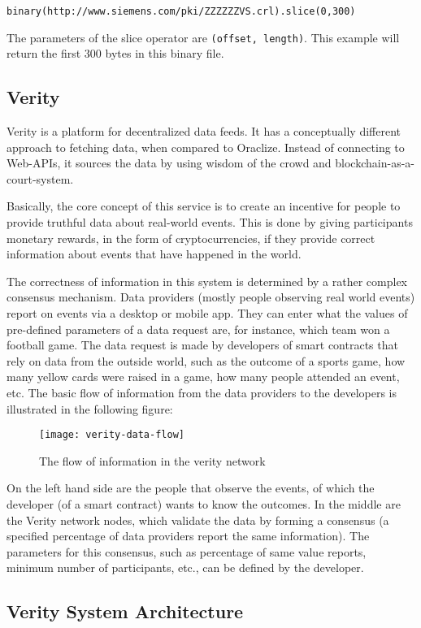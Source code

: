 \texttt{binary(http://www.siemens.com/pki/ZZZZZZVS.crl).slice(0,300)}

The parameters of the slice operator are \texttt{(offset, length)}. This example will return the first 300 bytes in this binary file.
\subsection{Verity}
Verity is a platform for decentralized data feeds. It has a conceptually different approach to fetching data, when compared to Oraclize. Instead of connecting to Web-APIs, it sources the data by using wisdom of the crowd and blockchain-as-a-court-system\cite{veritywhitepaper}.

Basically, the core concept of this service is to create an incentive for people to provide truthful data about real-world events. This is done by giving participants monetary rewards, in the form of cryptocurrencies, if they provide correct information about events that have happened in the world.

The correctness of information in this system is determined by a rather complex consensus mechanism. Data providers (mostly people observing real world events) report on events via a desktop or mobile app. They can enter what the values of pre-defined parameters of a data request are, for instance, which team won a football game. The data request is made by developers of smart contracts that rely on data from the outside world, such as the outcome of a sports game, how many yellow cards were raised in a game, how many people attended an event, etc. The basic flow of information from the data providers to the developers is illustrated in the following figure:
\begin{figure}[H]
\centering
\texttt{[image: verity-data-flow]}
\caption{The flow of information in the verity network\cite{veritywhitepaper}}
\end{figure}

On the left hand side are the people that observe the events, of which the developer (of a smart contract) wants to know the outcomes. In the middle are the Verity network nodes, which validate the data by forming a consensus (\eg a specified percentage of data providers report the same information). The parameters for this consensus, such as percentage of same value reports, minimum number of participants, etc., can be defined by the developer. 

\subsection*{Verity System Architecture}

